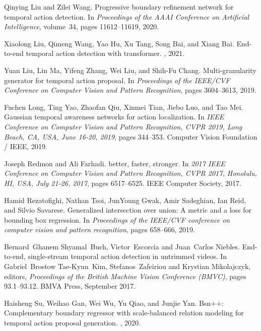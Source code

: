 \documentclass[10pt,twocolumn,letterpaper]{article}
\begin{document}
{\begin{thebibliography}{10}
Qinying Liu and Zilei Wang.
\newblock Progressive boundary refinement network for temporal action
  detection.
\newblock In {\em Proceedings of the AAAI Conference on Artificial
  Intelligence}, volume~34, pages 11612--11619, 2020.

Xiaolong Liu, Qimeng Wang, Yao Hu, Xu Tang, Song Bai, and Xiang Bai.
\newblock End-to-end temporal action detection with transformer.
, 2021.

Yuan Liu, Lin Ma, Yifeng Zhang, Wei Liu, and Shih-Fu Chang.
\newblock Multi-granularity generator for temporal action proposal.
\newblock In {\em Proceedings of the IEEE/CVF Conference on Computer Vision and
  Pattern Recognition}, pages 3604--3613, 2019.

Fuchen Long, Ting Yao, Zhaofan Qiu, Xinmei Tian, Jiebo Luo, and Tao Mei.
\newblock Gaussian temporal awareness networks for action localization.
\newblock In {\em {IEEE} Conference on Computer Vision and Pattern Recognition,
  {CVPR} 2019, Long Beach, CA, USA, June 16-20, 2019}, pages 344--353. Computer
  Vision Foundation / {IEEE}, 2019.

Joseph Redmon and Ali Farhadi.
 better, faster, stronger.
\newblock In {\em 2017 {IEEE} Conference on Computer Vision and Pattern
  Recognition, {CVPR} 2017, Honolulu, HI, USA, July 21-26, 2017}, pages
  6517--6525. {IEEE} Computer Society, 2017.

Hamid Rezatofighi, Nathan Tsoi, JunYoung Gwak, Amir Sadeghian, Ian Reid, and
  Silvio Savarese.
\newblock Generalized intersection over union: A metric and a loss for bounding
  box regression.
\newblock In {\em Proceedings of the IEEE/CVF conference on computer vision and
  pattern recognition}, pages 658--666, 2019.

Bernard~Ghanem Shyamal~Buch, Victor~Escorcia and Juan~Carlos Niebles.
\newblock End-to-end, single-stream temporal action detection in untrimmed
  videos.
\newblock In Gabriel~Brostow Tae-Kyun~Kim, Stefanos~Zafeiriou and Krystian
  Mikolajczyk, editors, {\em Proceedings of the British Machine Vision
  Conference (BMVC)}, pages 93.1--93.12. BMVA Press, September 2017.

Haisheng Su, Weihao Gan, Wei Wu, Yu Qiao, and Junjie Yan.
\newblock Bsn++: Complementary boundary regressor with scale-balanced relation
  modeling for temporal action proposal generation.
, 2020.


\end{thebibliography}}
\end{document}
